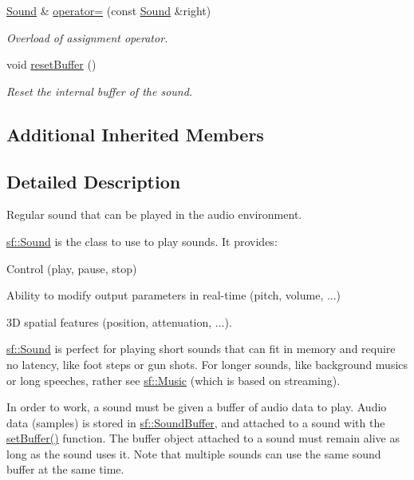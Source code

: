 \begin{DoxyCompactItemize}
\hyperlink{classsf_1_1_sound}{Sound} \& \hyperlink{classsf_1_1_sound_a08c64c9c1dabeebc59fbf2540d81d4dd}{operator=} (const \hyperlink{classsf_1_1_sound}{Sound} \&right)
\begin{DoxyCompactList}\small\item\em Overload of assignment operator. \end{DoxyCompactList}\item 
void \hyperlink{classsf_1_1_sound_acb7289d45e06fb76b8292ac84beb82a7}{reset\+Buffer} ()
\begin{DoxyCompactList}\small\item\em Reset the internal buffer of the sound. \end{DoxyCompactList}\end{DoxyCompactItemize}
\subsection*{Additional Inherited Members}


\subsection{Detailed Description}
Regular sound that can be played in the audio environment. 

\hyperlink{classsf_1_1_sound}{sf\+::\+Sound} is the class to use to play sounds. It provides\+: \begin{DoxyItemize}
\item Control (play, pause, stop) \item Ability to modify output parameters in real-\/time (pitch, volume, ...) \item 3D spatial features (position, attenuation, ...).\end{DoxyItemize}
\hyperlink{classsf_1_1_sound}{sf\+::\+Sound} is perfect for playing short sounds that can fit in memory and require no latency, like foot steps or gun shots. For longer sounds, like background musics or long speeches, rather see \hyperlink{classsf_1_1_music}{sf\+::\+Music} (which is based on streaming).

In order to work, a sound must be given a buffer of audio data to play. Audio data (samples) is stored in \hyperlink{classsf_1_1_sound_buffer}{sf\+::\+Sound\+Buffer}, and attached to a sound with the \hyperlink{classsf_1_1_sound_a8b395e9713d0efa48a18628c8ec1972e}{set\+Buffer()} function. The buffer object attached to a sound must remain alive as long as the sound uses it. Note that multiple sounds can use the same sound buffer at the same time.

